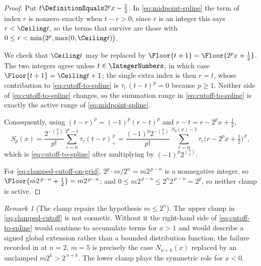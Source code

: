 \documentclass[11pt,a4paper,oneside,openany]{book}
\theoremstyle{definition}
\theoremstyle{remark}
\newtheorem{remark}[remark]{Remark}
\begin{document}
\begin{proof}
Put $t\DefinitionEquals2^px-\tfrac12$.  In \eqref{eq:midpoint-spline} the term of index $r$
is nonzero exactly when $t-r>0$; since $r$ is an integer this says
$r<\Ceiling t$, so the terms that survive are those with
$0\le r<\min\bigl(2^p,\max(0,\Ceiling t)\bigr)$.

We check that $\Ceiling t$ may be replaced by $\Floor{t+1}=\Floor{2^px+\tfrac12}$.
The two integers agree unless $t\in\IntegerNumbers$, in which case
$\Floor{t+1}=\Ceiling t+1$; the single extra index is then $r=t$, whose contribution
to \eqref{eq:cutoff-to-spline} is $\tau_t\,(t-t)^p=0$ because $p\ge1$.  Neither
side of \eqref{eq:cutoff-to-spline} changes, so the summation range in
\eqref{eq:cutoff-to-spline} is exactly the active range of
\eqref{eq:midpoint-spline}.

Consequently, using $(t-r)^p=(-1)^p(r-t)^p$ and $r-t=r-2^px+\tfrac12$,
\[
 S_p(x)=\frac{2^{-\binom p2}}{p!}\sum_{r=0}^{2^p-1}\tau_r(t-r)_+^{\,p}
 =\frac{(-1)^p2^{-\binom p2}}{p!}
  \sum_{r=0}^{N_p(x)-1}\tau_r\bigl(r-2^px+\tfrac12\bigr)^{\,p},
\]
which is \eqref{eq:cutoff-to-spline} after multiplying by
$(-1)^p2^{\binom p2}$.

For \eqref{eq:clamped-cutoff-on-grid}, $2^p\cdot m/2^n=m2^{\,p-n}$ is a
nonnegative integer, so $\Floor{m2^{\,p-n}+\tfrac12}=m2^{\,p-n}$; and
$0\le m2^{\,p-n}\le2^n2^{\,p-n}=2^p$, so neither clamp is active.
\end{proof}

\begin{remark}[The clamp repairs the hypothesis $m\le2^n$]\label{rem:clamp-repairs-hypothesis}
The upper clamp in \eqref{eq:clamped-cutoff} is not cosmetic.  Without it the
right-hand side of \eqref{eq:cutoff-to-spline} would continue to accumulate terms
for $x>1$ and would describe a signed global extension rather than a bounded
distribution function; the failure recorded in
 at $n=2$, $m=5$ is precisely the case
$N_{n+k}(x)$ replaced by an unclamped $m2^k>2^{\,n+k}$.  The lower clamp plays
the symmetric role for $x<0$.
\end{remark}


\end{document}
